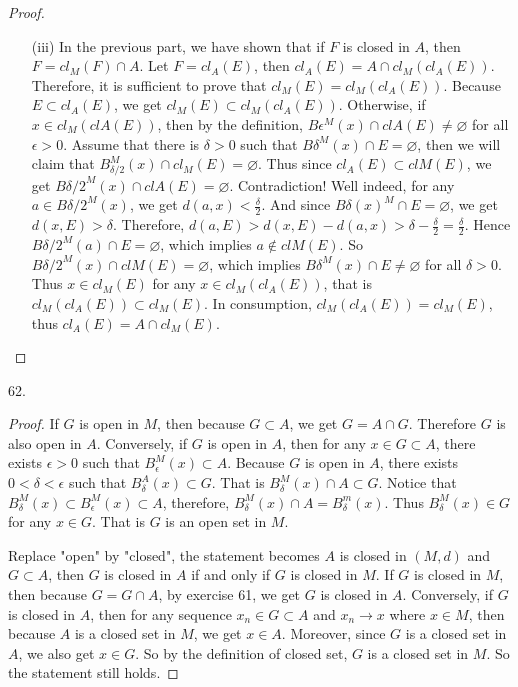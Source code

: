 \documentclass[12pt, a4paper]{article}
\theoremstyle{plain}
\begin{document}
\begin{proof}
\begin{enumerate}
\item[(iii)] In the previous part, we have shown that if $F$ is closed in $A$, then $F=cl_M(F)\cap A$. Let $F=cl_A(E)$, then $cl_A(E)=A\cap cl_M(cl_A(E))$. Therefore, it is sufficient to prove that $cl_M(E)=cl_M(cl_A(E))$. Because $E\subset cl_A(E)$, we get $cl_M(E)\subset cl_M(cl_A(E))$. Otherwise, if $x\in cl_M(clA(E))$, then by the definition, $B\epsilon^M(x)\cap clA(E)\neq \varnothing$ for all $\epsilon>0$. Assume that there is $\delta>0$ such that $B{\delta}^M(x)\cap E=\varnothing$, then we will claim that $B_{\delta/2}^M(x)\cap cl_M(E)=\varnothing$. Thus since $cl_A(E)\subset clM(E)$, we get $B{\delta/2}^M(x)\cap clA(E)=\varnothing$. Contradiction! Well indeed, for any $a\in B{\delta/2}^M(x)$, we get $d(a,x)<\frac{\delta}{2}$. And since $B\delta(x)^M\cap E=\varnothing$, we get $d(x,E)>\delta$. Therefore, $d(a,E)>d(x,E)-d(a,x)>\delta-\frac{\delta}{2}=\frac{\delta}{2}$. Hence $B{\delta/2}^M(a)\cap E=\varnothing$, which implies $a\notin clM(E)$. So $B{\delta/2}^M(x)\cap clM(E)=\varnothing$, which implies $B\delta^M(x)\cap E\neq \varnothing$ for all $\delta>0$. Thus $x\in cl_M(E)$ for any $x\in cl_M(cl_A(E))$, that is $cl_M(cl_A(E))\subset cl_M(E)$. In consumption, $cl_M(cl_A(E))=cl_M(E)$, thus $cl_A(E)=A\cap cl_M(E)$.
\end{enumerate}
\end{proof}

62.
\begin{proof}
If $G$ is open in $M$, then because $G\subset A$, we get $G=A\cap G$. Therefore $G$ is also open in $A$. Conversely, if $G$ is open in $A$, then for any $x\in G\subset A$, there exists $\epsilon>0$ such that $B_\epsilon^M(x)\subset A$. Because $G$ is open in $A$, there exists $0<\delta<\epsilon$ such that $B_\delta^A(x)\subset G$. That is $B_\delta^M(x)\cap A\subset G$. Notice that $B_\delta^M(x)\subset B_\epsilon^M(x)\subset A$, therefore, $B_\delta^M(x)\cap A=B_\delta^m(x)$. Thus $B_\delta^M(x)\in G$ for any $x\in G$. That is $G$ is an open set in $M$.

Replace "open" by "closed", the statement becomes $A$ is closed in $(M,d)$ and $G\subset A$, then $G$ is closed in $A$ if and only if $G$ is closed in $M$. If $G$ is closed in $M$, then because $G=G\cap A$, by exercise 61, we get $G$ is closed in $A$. Conversely, if $G$ is closed in $A$, then for any sequence $x_n\in G\subset A$ and $x_n\rightarrow x$ where $x\in M$, then because $A$ is a closed set in $M$, we get $x\in A$. Moreover, since $G$ is a closed set in $A$, we also get $x\in G$. So by the definition of closed set, $G$ is a closed set in $M$. So the statement still holds.
\end{proof}
\end{document}
